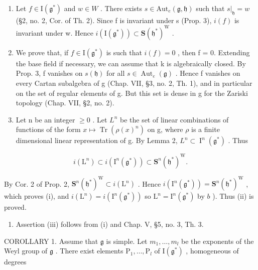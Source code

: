 \begin{enumerate}
\def\labelenumi{\alph{enumi})}
\item
  Let \(f \in \mathrm{I}(\mathfrak{g}^{*})\) and \(w \in W\) . There exists \(s \in \mathrm{Aut}_{e}(\mathfrak{g}, \mathfrak{h})\) such that \(s|_{\mathfrak{h}} = w\) (§2, no. 2, Cor. of Th. 2). Since f is invariant under s (Prop. 3), \(i(f)\) is invariant under w. Hence \(i(\mathrm{I}(\mathfrak{g}^{*})) \subset \mathbf{S}(\mathfrak{h}^{*})^{\mathrm{W}}\) .
\item
  We prove that, if \(f \in \mathrm{I}(\mathfrak{g}^{*})\) is such that \(i(f) = 0\) , then f = 0. Extending the base field if necessary, we can assume that k is algebraically closed. By Prop. 3, f vanishes on \(s(\mathfrak{h})\) for all \(s \in \operatorname{Aut}_{e}(\mathfrak{g})\) . Hence f vanishes on every Cartan subalgebra of g (Chap. VII, §3, no. 2, Th. 1), and in particular on the set of regular elements of g. But this set is dense in g for the Zariski topology (Chap. VII, §2, no. 2).
\item
  Let n be an integer \(\geq 0\) . Let \(L^{n}\) be the set of linear combinations of functions of the form \(x \mapsto \operatorname{Tr}(\rho(x)^{n})\) on g, where \(\rho\) is a finite dimensional linear representation of g. By Lemma 2, \(L^{n} \subset \operatorname{I}^{n}(\mathfrak{g}^{*})\) . Thus
\end{enumerate}

\[
i \left(\mathrm{L} ^ {n}\right) \subset i \left(\mathrm{I} ^ {n} \left(\mathfrak {g} ^ {*}\right)\right) \subset \mathbf {S} ^ {n} \left(\mathfrak {h} ^ {*}\right) ^ {\mathrm{W}}.
\]

By Cor. 2 of Prop. 2, \(\mathbf{S}^n (\mathfrak{h}^*)^{\mathrm{W}}\subset i(\mathrm{L}^n)\) . Hence \(i(\mathrm{I}^n (\mathfrak{g}^*)) = \mathbf{S}^n (\mathfrak{h}^*)^{\mathrm{W}}\) , which proves (i), and \(i(\mathrm{L}^n) = i(\mathrm{I}^n (\mathfrak{g}^*))\) so \(\mathrm{L}^n = \mathrm{I}^n (\mathfrak{g}^*)\) by \(b\) ). Thus (ii) is proved.

\begin{enumerate}
\def\labelenumi{\alph{enumi})}
\setcounter{enumi}{3}
\tightlist
\item
  Assertion (iii) follows from (i) and Chap. V, §5, no. 3, Th. 3.
\end{enumerate}

COROLLARY 1. Assume that \(\mathfrak{g}\) is simple. Let \(m_1, \ldots, m_l\) be the exponents of the Weyl group of \(\mathfrak{g}\) . There exist elements \(\mathrm{P}_1, \ldots, \mathrm{P}_l\) of \(\mathrm{I}(\mathfrak{g}^*)\) , homogeneous of degrees

